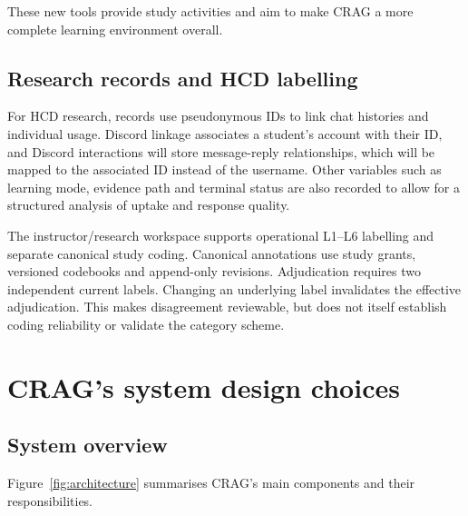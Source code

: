 These new tools provide study activities and aim to make CRAG a more complete learning environment overall.

\section{Research records and HCD labelling}
For HCD research, records use pseudonymous IDs to link chat histories and individual usage. Discord linkage associates a student's account with their ID, and Discord interactions will store message-reply relationships, which will be mapped to the associated ID instead of the username. Other variables such as learning mode, evidence path and terminal status are also recorded to allow for a structured analysis of uptake and response quality.

The instructor/research workspace supports operational L1--L6 labelling and separate canonical study coding. Canonical annotations use study grants, versioned codebooks and append-only revisions. Adjudication requires two independent current labels. Changing an underlying label invalidates the effective adjudication. This makes disagreement reviewable, but does not itself establish coding reliability or validate the category scheme.

\chapter{CRAG's system design choices}
\section{System overview}
Figure~\ref{fig:architecture} summarises CRAG's main components and their responsibilities.

